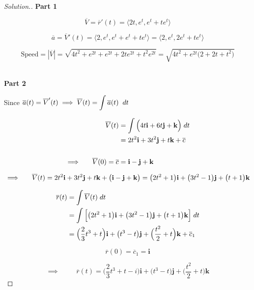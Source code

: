 \documentclass[11pt,a4paper]{article}
\theoremstyle{definition}
\newenvironment{solution}
  {\renewcommand{\qedsymbol}{}\begin{proof}[\textit{Solution}.]}
  {\end{proof}}
\newcommand{\subhead}[1]{%
  \par\medskip\noindent\textbf{#1}\par\nobreak\smallskip}
\begin{document}
\begin{solution}
\subhead{Part 1}
$$\overline{V} = \overline{r}'(t) = \big\langle 2t, e^t, e^t + te^t\big\rangle$$

$$\overline{a} = \overline{V}'(t) = \big\langle 2, e^t, e^t+e^t+te^t\big\rangle = \big\langle 2, e^t, 2e^t+te^t\big\rangle$$

$$\text{Speed} = \left|\overline{V}\right| = \sqrt{4t^2 + e^{2t} + e^{2t} + 2te^{2t} + t^2e^{2t}} = \sqrt{4t^2 + e^{2t}\big(2 + 2t + t^2\big)}$$\\

\subhead{Part 2}
Since $\overline{a}(t) = \overline{V}'(t) \implies \overline{V}(t) = \displaystyle{\int \overline{a}(t)\hspace{0.2cm}dt}$

\begin{align*}
\overline{V}(t) & = \int \Big( 4t\textbf{i} + 6t\textbf{j} + \textbf{k}\Big)\hspace{0.1cm}dt\\
& = 2t^2\textbf{i} + 3t^2\textbf{j} + t\textbf{k} + \overline{c}\\\\
\implies \hspace{0.5cm} \overline{V}(0)  = \overline{c} & = \textbf{i} - \textbf{j} + \textbf{k}
\end{align*}

$$\implies \hspace{0.5cm} \overline{V}(t) = 2t^2\textbf{i} + 3t^2\textbf{j} + t\textbf{k} + \big(\textbf{i} - \textbf{j} + \textbf{k}\big) = \big(2t^2 + 1\big)\textbf{i} + \big(3t^2-1\big)\textbf{j} + \big(t +1\big)\textbf{k}$$

\begin{align*}
\overline{r}(t) & = \int \overline{V}(t)\hspace{0.1cm}dt\\
& = \int \Big[\big(2t^2 + 1\big)\textbf{i} + \big(3t^2-1\big)\textbf{j} + \big(t +1\big)\textbf{k}\Big]\hspace{0.1cm}dt\\
& = \Big(\frac{2}{3}t^3 + t\Big)\textbf{i} + \big(t^3-t\big)\textbf{j} + \Big(\dfrac{t^2}{2} + t\Big)\textbf{k} + \overline{c}_1
\end{align*}

$$\overline{r}(0) = \overline{c}_1 = \textbf{i}$$

$$\implies\hspace{1cm} \overline{r}(t) = \Big(\frac{2}{3}t^3 + t - i\Big)\textbf{i} + \big(t^3-t\big)\textbf{j} + \Big(\dfrac{t^2}{2} + t\Big)\textbf{k}$$
\end{solution}
\end{document}
